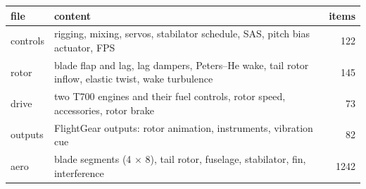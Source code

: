 \begin{tabularx}{\columnwidth}{@{}lXr@{}}
\toprule
file & content & items \\
\midrule
controls & rigging, mixing, servos, stabilator schedule, SAS, pitch bias actuator, FPS & 122 \\
rotor & blade flap and lag, lag dampers, Peters--He wake, tail rotor inflow, elastic twist, wake turbulence & 145 \\
drive & two T700 engines and their fuel controls, rotor speed, accessories, rotor brake & 73 \\
outputs & FlightGear outputs: rotor animation, instruments, vibration cue & 82 \\
aero & blade segments (4 $\times$ 8), tail rotor, fuselage, stabilator, fin, interference & 1242 \\
\bottomrule
\end{tabularx}
